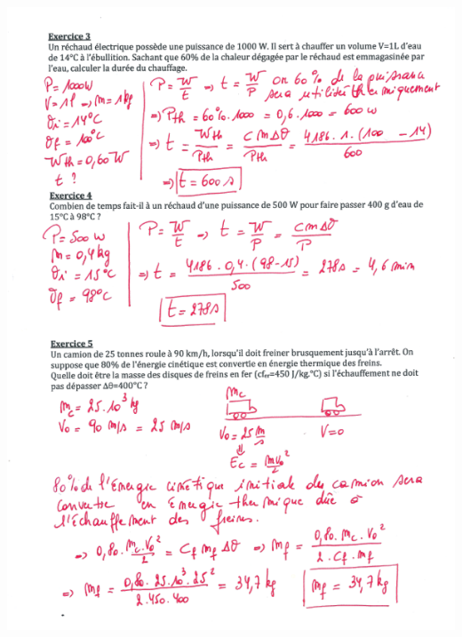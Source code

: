 \includegraphics[width=19.239cm,height=26.741cm]{Pictures/10000001000002530000033C5B177CADC8B81C22.png}

